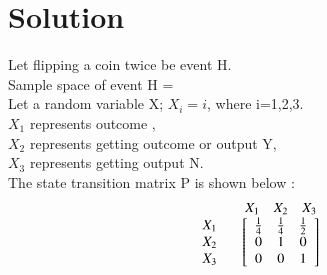 \documentclass[journal,12pt,twocolumn]{IEEEtran}
\begin{document}
\section*{Solution}
Let flipping a coin twice be event H.\\
Sample space of event H = \\
Let a random variable X; $X_{i}=i$, where i=1,2,3. \\
 $X_{1}$ represents outcome , 
 \\$X_{2}$ represents getting outcome  or output Y,
 \\ $X_{3}$ represents getting output N.\\
The state transition matrix P is shown below :
\begin{align}
\begin{array}{c c} &
\begin{array}{c c c} X_{1}  & X_{2} & X_{3} \\
\end{array}
\\
\begin{array}{c c c}
X_{1} \\
X_{2}\\
X_{3}
\end{array}
&
\left[
\begin{array}{c c c}
\frac{1}{4} & \frac{1}{4} & \frac{1}{2} \\
0 & 1 & 0 \\
0 & 0 & 1 
\end{array}
\right]
\end{array}
\end{align}
\\
\end{document}
